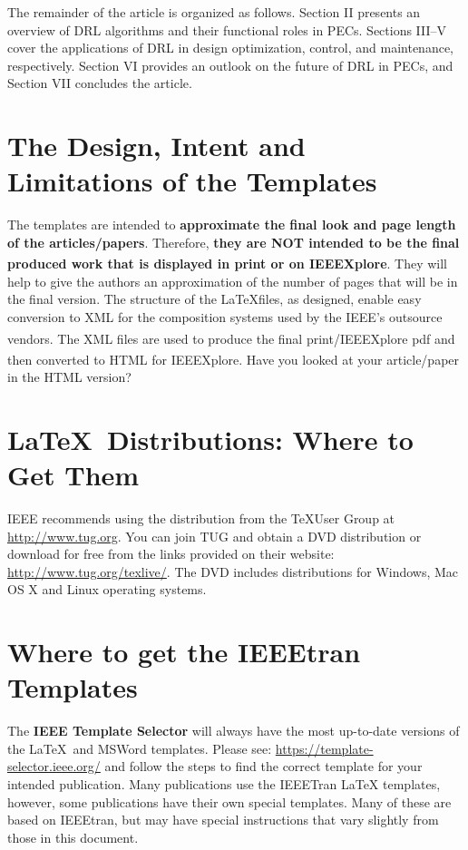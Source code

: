 \documentclass[lettersize,journal]{IEEEtran}
\begin{document}
The remainder of the article is organized as follows. Section II presents an overview of DRL algorithms and their functional roles in PECs. Sections III–V cover the applications of DRL in design optimization, control, and maintenance, respectively. Section VI provides an outlook on the future of DRL in PECs, and Section VII concludes the article.
  

\section{The Design, Intent and \\ Limitations of the Templates}
\noindent The templates are intended to {\bf{approximate the final look and page length of the articles/papers}}. Therefore, {\bf{they are NOT intended to be the final produced work that is displayed in print or on IEEEXplore\textsuperscript{\textregistered}}}. They will help to give the authors an approximation of the number of pages that will be in the final version. The structure of the \LaTeX files, as designed, enable easy conversion to XML for the composition systems used by the IEEE's outsource vendors. The XML files are used to produce the final print/IEEEXplore\textsuperscript{\textregistered} pdf and then converted to HTML for IEEEXplore\textsuperscript{\textregistered}. Have you looked at your article/paper in the HTML version?

\section{\LaTeX \ Distributions: Where to Get Them}
\noindent IEEE recommends using the distribution from the \TeX User Group at \url{http://www.tug.org}. You can join TUG and obtain a DVD distribution or download for free  from the links provided on their website: \url{http://www.tug.org/texlive/}. The DVD includes distributions for Windows, Mac OS X and Linux operating systems.
 
\section{Where to get the IEEEtran Templates}
\noindent The {\bf{IEEE Template Selector}} will always have the most up-to-date versions of the \LaTeX\ and MSWord templates. Please see: \url{https://template-selector.ieee.org/} and follow the steps to find the correct template for your intended publication. Many publications use the IEEETran LaTeX templates, however, some publications have their own special templates. Many of these are  based on IEEEtran, but may have special instructions that vary slightly from those in this document.
\end{document}
